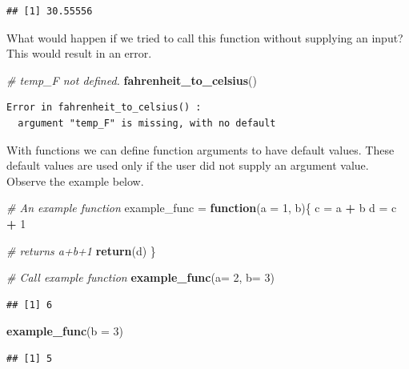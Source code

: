 \documentclass[
]{book}
\newenvironment{Shaded}{\begin{snugshade}}{\end{snugshade}}
\newcommand{\CommentTok}[1]{\textcolor[rgb]{0.56,0.35,0.01}{\textit{#1}}}
\newcommand{\ControlFlowTok}[1]{\textcolor[rgb]{0.13,0.29,0.53}{\textbf{#1}}}
\newcommand{\DataTypeTok}[1]{\textcolor[rgb]{0.13,0.29,0.53}{#1}}
\newcommand{\DecValTok}[1]{\textcolor[rgb]{0.00,0.00,0.81}{#1}}
\newcommand{\KeywordTok}[1]{\textcolor[rgb]{0.13,0.29,0.53}{\textbf{#1}}}
\newcommand{\NormalTok}[1]{#1}
\newcommand{\OperatorTok}[1]{\textcolor[rgb]{0.81,0.36,0.00}{\textbf{#1}}}
\newcommand{\StringTok}[1]{\textcolor[rgb]{0.31,0.60,0.02}{#1}}
\begin{document}
\begin{verbatim}
## [1] 30.55556
\end{verbatim}

What would happen if we tried to call this function without supplying an input? This would result in an error.

\begin{Shaded}
\begin{Highlighting}[]
\CommentTok{# temp_F not defined. }
\KeywordTok{fahrenheit_to_celsius}\NormalTok{()}
\end{Highlighting}
\end{Shaded}

\begin{verbatim}
Error in fahrenheit_to_celsius() : 
  argument "temp_F" is missing, with no default
\end{verbatim}

With functions we can define function arguments to have default values. These default values are used only if the user did not supply an argument value. Observe the example below.

\begin{Shaded}
\begin{Highlighting}[]
\CommentTok{# An example function }
\NormalTok{example_func =}\StringTok{ }\ControlFlowTok{function}\NormalTok{(}\DataTypeTok{a =} \DecValTok{1}\NormalTok{, b)\{}
\NormalTok{  c =}\StringTok{ }\NormalTok{a }\OperatorTok{+}\StringTok{ }\NormalTok{b}
\NormalTok{  d =}\StringTok{ }\NormalTok{c }\OperatorTok{+}\StringTok{ }\DecValTok{1}
  
  \CommentTok{# returns a+b+1}
  \KeywordTok{return}\NormalTok{(d)}
\NormalTok{\}}

\CommentTok{# Call example function}
\KeywordTok{example_func}\NormalTok{(}\DataTypeTok{a=} \DecValTok{2}\NormalTok{, }\DataTypeTok{b=} \DecValTok{3}\NormalTok{)}
\end{Highlighting}
\end{Shaded}

\begin{verbatim}
## [1] 6
\end{verbatim}

\begin{Shaded}
\begin{Highlighting}[]
\KeywordTok{example_func}\NormalTok{(}\DataTypeTok{b =} \DecValTok{3}\NormalTok{)}
\end{Highlighting}
\end{Shaded}

\begin{verbatim}
## [1] 5
\end{verbatim}
\end{document}
